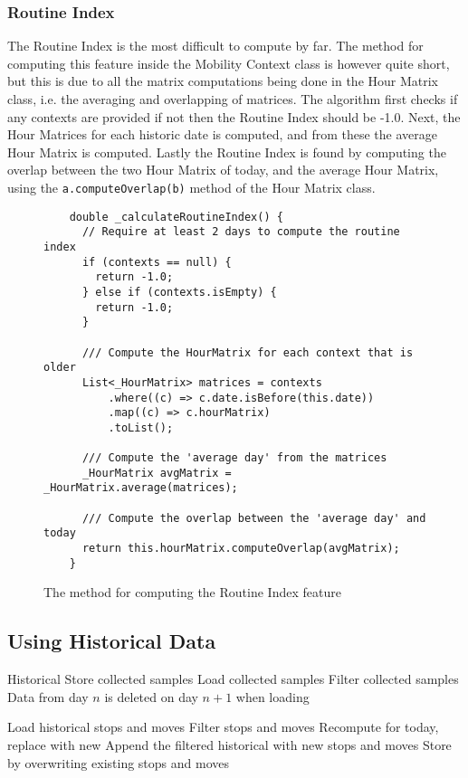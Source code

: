 \subsubsection{Routine Index}
The Routine Index is the most difficult to compute by far. The method for computing this feature inside the Mobility Context class is however quite short, but this is due to all the matrix computations being done in the Hour Matrix class, i.e. the averaging and overlapping of matrices. The algorithm first checks if any contexts are provided if not then the Routine Index should be -1.0. Next, the Hour Matrices for each historic date is computed, and from these the average Hour Matrix is computed. Lastly the Routine Index is found by computing the overlap between the two Hour Matrix of today, and the average Hour Matrix, using the \verb|a.computeOverlap(b)| method of the Hour Matrix class.

\begin{figure}
    \centering
    \begin{verbatim}
    double _calculateRoutineIndex() {
      // Require at least 2 days to compute the routine index
      if (contexts == null) {
        return -1.0;
      } else if (contexts.isEmpty) {
        return -1.0;
      }
    
      /// Compute the HourMatrix for each context that is older
      List<_HourMatrix> matrices = contexts
          .where((c) => c.date.isBefore(this.date))
          .map((c) => c.hourMatrix)
          .toList();
    
      /// Compute the 'average day' from the matrices
      _HourMatrix avgMatrix = _HourMatrix.average(matrices);
    
      /// Compute the overlap between the 'average day' and today
      return this.hourMatrix.computeOverlap(avgMatrix);
    }
    \end{verbatim}
    \caption{The method for computing the Routine Index feature}
    \label{fig:routine-index-code}
\end{figure}


\subsection{Using Historical Data}
Historical  Store collected samples
Load collected samples
Filter collected samples
Data from day $n$ is deleted on day $n+1$ when loading

Load historical stops and moves
Filter stops and moves
Recompute for today, replace with new 
Append the filtered historical with new stops and moves
Store by overwriting existing stops and moves

